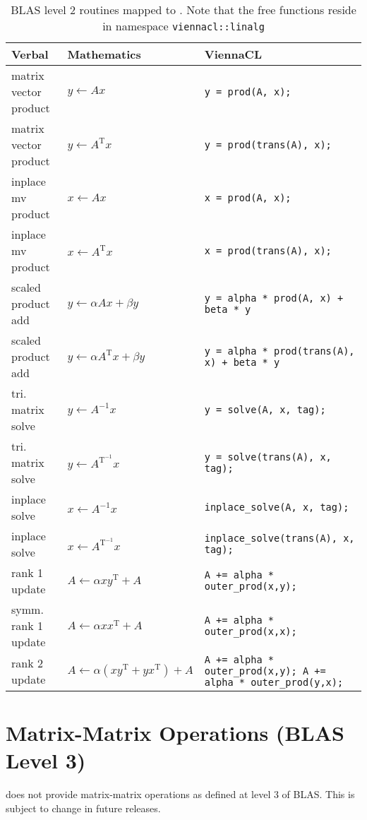 \begin{table}[tb]
\begin{center}
\renewcommand{\arraystretch}{1.2}
\begin{tabular}{p{4cm}|l|p{7cm}}
Verbal & Mathematics & ViennaCL\\
\hline
matrix vector product & $y \leftarrow A x$ & \texttt{y = prod(A, x);} \\
matrix vector product & $y \leftarrow A^\mathrm{T} x$ & \texttt{y = prod(trans(A), x);} \\
inplace mv product & $x \leftarrow A x$ & \texttt{x = prod(A, x);} \\
inplace mv product & $x \leftarrow A^\mathrm{T} x$ & \texttt{x = prod(trans(A), x);} \\
\hline
scaled product add & $y \leftarrow \alpha A x + \beta y$ & \texttt{y = alpha * prod(A, x) + beta * y} \\
scaled product add & $y \leftarrow \alpha A^{\mathrm T} x + \beta y$ & \texttt{y = alpha * prod(trans(A), x) + beta * y} \\
\hline
tri. matrix solve & $y \leftarrow A^{-1} x$ & \texttt{y = solve(A, x, tag);} \\
tri. matrix solve & $y \leftarrow A^\mathrm{T^{-1}} x$ & \texttt{y = solve(trans(A), x, tag);} \\
inplace solve & $x \leftarrow A^{-1} x$ & \texttt{inplace\_solve(A, x, tag);} \\
inplace solve & $x \leftarrow A^\mathrm{T^{-1}} x$ & \texttt{inplace\_solve(trans(A), x, tag);} \\
\hline
rank 1 update & $A \leftarrow \alpha x y^{\mathrm T} + A$ & \texttt{A += alpha * outer\_prod(x,y);} \\
symm. rank 1 update & $A \leftarrow \alpha x x^{\mathrm T} + A$ & \texttt{A += alpha * outer\_prod(x,x);} \\
rank 2 update & $A \leftarrow \alpha (x y^{\mathrm T} + y x^{\mathrm T}) + A$ & \texttt{A += alpha * outer\_prod(x,y); A += alpha * outer\_prod(y,x);} \\
\end{tabular}
\caption{BLAS level 2 routines mapped to \ViennaCL. Note that the free functions reside in namespace \texttt{viennacl::linalg}}
\label{tab:blas-level-2}
\end{center}
\end{table}

\section{Matrix-Matrix Operations (BLAS Level 3)}
{\ViennaCLminorversion} does not provide matrix-matrix operations as defined at level
3 of BLAS. This is subject to change in future releases.

